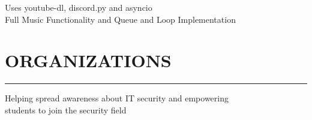 \documentclass[]{resume}
\begin{document}
\hfill
\begin{minipage}[t]{0.66\textwidth}

    \vspace{-55.9pt}


    \vspace{8pt}
     
    \vspace{4pt}
    \begin{minipage}{0.85\textwidth\vspace{2pt}}
        Uses youtube-dl, discord.py and asyncio\\
        Full Music Functionality and Queue and Loop Implementation
    \end{minipage}


    \section{ORGANIZATIONS}
    \noindent\rule{12.5cm}{0.4pt}

     
    \noindent

    \vspace{8pt}
     
    \noindent

    \vspace{8pt}
     
    \noindent
    \vspace{-8pt}
    \hspace{5em}
    \begin{minipage}{0.85\textwidth\vspace{4pt}}
        Helping spread awareness about IT security and empowering\\
        students to join the security field
    \end{minipage}

\end{minipage}
\end{document}
